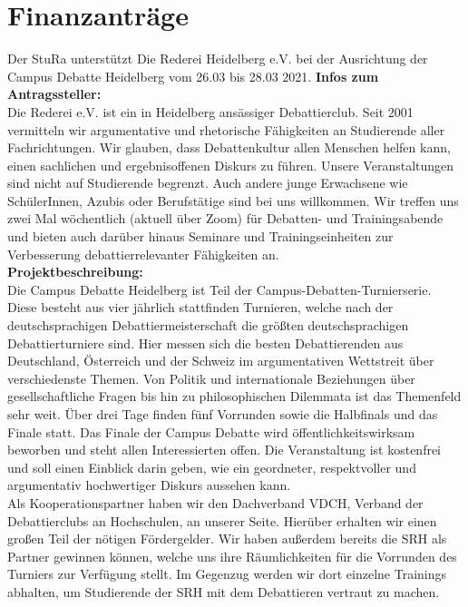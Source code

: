 \section{Finanzanträge}
{
    Der StuRa unterstützt Die Rederei Heidelberg e.V. bei der Ausrichtung der Campus Debatte Heidelberg vom 26.03 bis 28.03 2021.
}{
    \textbf{Infos zum Antragssteller:}\\
    Die Rederei e.V. ist ein in Heidelberg ansässiger Debattierclub. Seit 2001 vermitteln wir argumentative und rhetorische Fähigkeiten an Studierende aller Fachrichtungen. Wir glauben, dass Debattenkultur allen Menschen helfen kann, einen sachlichen und ergebnisoffenen Diskurs zu führen. Unsere Veranstaltungen sind nicht auf Studierende begrenzt. Auch andere junge Erwachsene wie SchülerInnen, Azubis oder Berufstätige sind bei uns willkommen. Wir treffen uns zwei Mal wöchentlich (aktuell über Zoom) für Debatten- und Trainingsabende und bieten auch darüber hinaus Seminare und Trainingseinheiten zur Verbesserung debattierrelevanter Fähigkeiten an.\\[1em]
    \textbf{Projektbeschreibung:}\\
    Die Campus Debatte Heidelberg ist Teil der Campus-Debatten-Turnierserie.  Diese besteht aus vier jährlich stattfinden Turnieren, welche nach der deutschsprachigen Debattiermeisterschaft die größten deutschsprachigen Debattierturniere sind. Hier messen sich die besten Debattierenden aus Deutschland, Österreich und der Schweiz im argumentativen Wettstreit über verschiedenste Themen. Von Politik und internationale Beziehungen über gesellschaftliche Fragen bis hin zu philosophischen Dilemmata ist das Themenfeld sehr weit. Über drei Tage finden fünf Vorrunden sowie die Halbfinals und das Finale statt.  Das Finale der Campus Debatte wird öffentlichkeitswirksam beworben und steht allen Interessierten offen. Die Veranstaltung ist kostenfrei und soll einen Einblick darin geben, wie ein geordneter, respektvoller und argumentativ hochwertiger Diskurs aussehen kann.\\
    Als Kooperationspartner haben wir den Dachverband VDCH, Verband der Debattierclubs an Hochschulen, an unserer Seite. Hierüber erhalten wir einen großen Teil der nötigen Fördergelder. Wir haben außerdem bereits die SRH als Partner gewinnen können, welche uns ihre Räumlichkeiten für die Vorrunden des Turniers zur Verfügung stellt. Im Gegenzug werden wir dort einzelne Trainings abhalten, um Studierende der SRH mit dem Debattieren vertraut zu machen.\\[1em]
}
